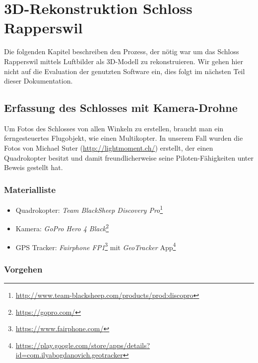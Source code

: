 \chapter{3D-Rekonstruktion Schloss Rapperswil}


Die folgenden Kapitel beschreiben den Prozess, der nötig war um das Schloss
Rapperswil mittels Luftbilder als 3D-Modell zu rekonstruieren. Wir gehen hier
nicht auf die Evaluation der genutzten Software ein, dies folgt im nächsten Teil
dieser Dokumentation.


\section{Erfassung des Schlosses mit Kamera-Drohne}

\label{workflow:drone}

Um Fotos des Schlosses von allen Winkeln zu erstellen, braucht man ein
ferngesteuertes Flugobjekt, wie \zb{} einen Multikopter. In unserem Fall wurden
die Fotos von Michael Suter (\url{http://lightmoment.ch/}) erstellt, der einen
Quadrokopter besitzt und damit freundlicherweise seine Piloten-Fähigkeiten unter
Beweis gestellt hat.

\subsection{Materialliste}

\begin{itemize}
	\item Quadrokopter: \textit{Team BlackSheep Discovery
		Pro}\footnote{\url{http://www.team-blacksheep.com/products/prod:discopro}}
	\item Kamera: \textit{GoPro Hero 4 Black}\footnote{\url{https://gopro.com/}}
	\item GPS Tracker: \textit{Fairphone
		FP1}\footnote{\url{https://www.fairphone.com/}} mit
		\textit{GeoTracker}
		App\footnote{\url{https://play.google.com/store/apps/details?id=com.ilyabogdanovich.geotracker}}
\end{itemize}

\subsection{Vorgehen}

